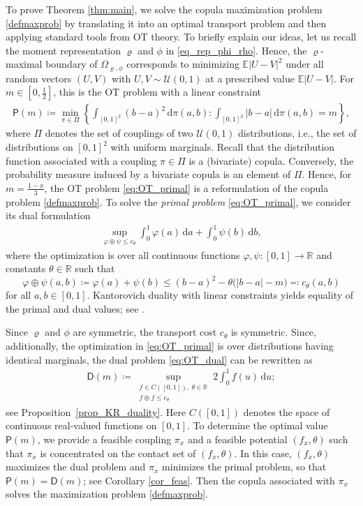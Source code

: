 \documentclass{article}
\newcommand{\de}{\mathrm{\,d}}
\newcommand{\E}{\mathbb{E}}
\newcommand{\R}{\mathbb{R}}
\newcommand{\cU}{\mathcal{U}}
\begin{document}
To prove Theorem \ref{thm:main}, we solve the copula maximization problem \eqref{defmaxprob} by translating it into an optimal transport problem and then applying standard tools from OT theory.
To briefly explain our ideas, let us recall the moment representation \(\varrho\) and \(\phi\) in \eqref{eq_rep_phi_rho}. 
Hence, the \(\varrho\)-maximal boundary of \(\Omega_{\varrho,\phi}\) corresponds to minimizing \(\E|U-V|^2\) under all random vectors \((U,V)\) with \(U,V\sim \cU(0,1)\) at a prescribed value \(\E|U-V|\).
For \(m\in[0,\tfrac12]\), this is the OT problem with a linear constraint
\begin{align}\label{eq:OT_primal}
    \mathsf{P}(m)\coloneqq\min_{\pi\in \Pi}\left\{ \int_{[0,1]^2} (b-a)^2 \de \pi(a,b)  \colon \int_{[0,1]^2} |b-a| \de \pi(a,b) = m\right\},
\end{align}
where \(\Pi\) denotes the set of couplings of two \(\cU(0,1)\) distributions, i.e., the set of distributions on \([0,1]^2\) with uniform marginals.
Recall that the distribution function associated with a coupling \(\pi\in \Pi\) is a (bivariate) copula.
Conversely, the probability measure induced by a bivariate copula is an element of \(\Pi\).
Hence, for \(m = \frac{1-x}{3}\), the OT problem \eqref{eq:OT_primal} is a reformulation of the copula problem \eqref{defmaxprob}.
To solve the \emph{primal problem} \eqref{eq:OT_primal}, we consider its dual formulation
\begin{align}\label{eq:OT_dual}
    \sup_{\varphi \oplus \psi \leq c_\theta} \int_0^1 \varphi(a) \de a + \int_0^1 \psi(b) \de b ,
\end{align}
where the optimization is over all continuous functions \(\varphi,\psi\colon [0,1]\to \R\) and constants \(\theta\in \R\) such that
\[
    \varphi\oplus\psi(a,b)\coloneqq\varphi(a)+\psi(b)
    \leq (b-a)^2-\theta\bigl(|b-a|-m\bigr)
    \eqqcolon c_\theta(a,b)
\]
for all \(a,b\in[0,1]\).
Kantorovich duality with linear constraints yields equality of the primal and dual values; see \cite[Theorem~2.1]{zaev2015monge}.

Since \(\varrho\) and \(\phi\) are symmetric, the transport cost \(c_\theta\) is symmetric.
Since, additionally, the optimization in \eqref{eq:OT_primal} is over distributions having identical marginals, the dual problem \eqref{eq:OT_dual} can be rewritten as
\begin{align}\label{eq:OT_dual2}
    \mathsf{D}(m)\coloneqq
    \sup_{\substack{f\in C([0,1]),\ \theta\in\R\\ f\oplus f\leq c_\theta}}
    2\int_0^1 f(u)\de u;
\end{align}
see Proposition~\ref{prop_KR_duality}.
Here \(C([0,1])\) denotes the space of continuous real-valued functions on \([0,1]\).
To determine the optimal value \(\mathsf{P}(m)\), we provide a feasible coupling \(\pi_x\) and a feasible potential \((f_x,\theta)\) such that \(\pi_x\) is concentrated on the contact set of \((f_x,\theta)\).
In this case, \((f_x,\theta)\) maximizes the dual problem and \(\pi_x\) minimizes the primal problem, so that \(\mathsf{P}(m)=\mathsf{D}(m)\); see Corollary \ref{cor_feas}.
Then the copula associated with \(\pi_x\) solves the maximization problem \eqref{defmaxprob}.
\end{document}
